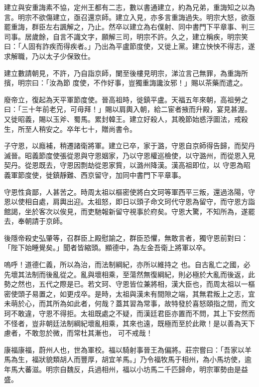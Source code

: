 \begin{pinyinscope}
 建立與安重誨素不協，定州王都有二志，數以書通建立，約為兄弟，重誨知之以為言。明宗不欲傷建立，亟召還京師。建立入見，亦多言重誨過失。明宗大怒，欲亟罷重誨，群臣左右諷解之，乃止。然卒以建立為右僕射、同中書門下平章事、判三司事。居歲餘，自言不識文字，願解三司，明宗不許。久之，建立稱疾，明宗笑曰：「人固有詐疾而得疾者。」乃出為平盧節度使，又徙上黨。建立怏怏不得志，遂求解職，乃以太子少保致仕。



 建立數請朝見，不許，乃自詣京師，闌至後樓見明宗，涕泣言己無罪，為重誨所擯，明宗曰：「汝為節
 度使，不作好事，豈獨重誨讒汝邪！」賜以茶藥而遣之。



 廢帝立，復起為天平軍節度使。晉高祖時，徙鎮平盧。天福五年來朝，高祖勞之曰：「三十年前老兄，可毋拜！」賜以肩輿入朝，給二宦者掖而升殿，宴見甚渥。又徙昭義，賜以玉斧、蜀馬。累封韓王。建立好殺人，其晚節始惑浮圖法，戒殺生，所至人稍安之。卒年七十，贈尚書令。



 子守恩，以廕補，稍遷諸衛將軍。建立已卒，家于潞，守恩自京師得告歸，而契丹滅晉。昭義節度使張從恩與守恩姻家，乃以守恩權巡檢使，以守潞州，而從恩入見契丹。從恩既去，守恩因剽劫從恩家貲，以潞州降漢。漢高祖即位，以
 守恩為昭義軍節度使，徙鎮靜難、西京留守，加同中書門下平章事。



 守恩性貪鄙，人甚苦之。時周太祖以樞密使將白文珂等軍西平三叛，還過洛陽，守恩以使相自處，肩輿出迎。太祖怒，即日以頭子命文珂代守恩為留守，而守恩方詣館謁，坐於客次以俟見，而吏馳報新留守視事於府矣。守恩大驚，不知所為，遂罷去，奉朝請于京師。



 後隱帝殺史弘肇等，召群臣上殿慰諭之，群臣恐懼，無敢言者，獨守恩前對曰：「陛下始睡覺矣。」聞者皆縮頭。顯德中，為左金吾衛上將軍以卒。



 嗚呼！道德仁義，所以為治，而法制綱紀，亦所以維持之
 也。自古亂亡之國，必先壞其法制而後亂從之。亂與壞相乘，至蕩然無復綱紀，則必極於大亂而後返，此勢之然也，五代之際是已。若文珂、守恩皆位兼將相，漢大臣也，而周太祖以一樞密使頭子易置之，如更戍卒。是時，太祖與漢未有間隙之端，其無君叛上之志，宜未萌於心，而其所為如此者，何哉？蓋其習為常事，故特發於喜怒頤指之間，而文珂不敢違，守恩不得拒。太祖既處之不疑，而漢廷君臣亦置而不問，其上下安然而不怪者，豈非朝廷法制綱紀壞亂相乘，其來也遠，既極而至於此歟！是以善為天下慮者，不敢忽於微，而常杜其漸也，
 可不戒哉！



 康福康福，蔚州人也，世為軍校。福以騎射事晉王為偏將。莊宗嘗曰：「吾家以羊馬為生，福狀貌類胡人而豐厚，胡宜羊馬。」乃令福牧馬于相州，為小馬坊使，逾年馬大蕃滋。明宗自魏反，兵過相州，福以小坊馬二千匹歸命，明宗軍勢由是益盛。




\end{pinyinscope}

